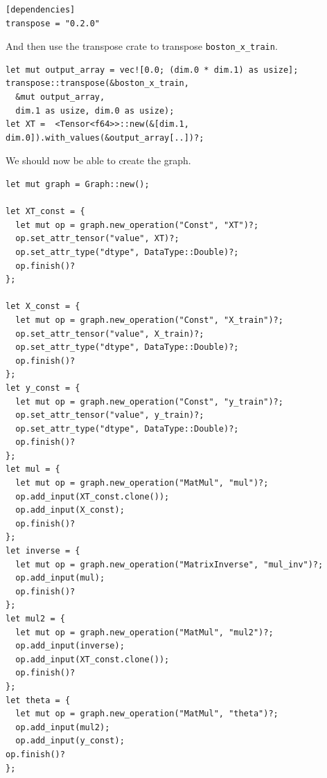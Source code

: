 \documentclass{book}
\begin{document}
\begin{lstlisting}[caption={chapter2\\/rust\_and\_tf\\/Cargo\\.toml}]
[dependencies]
transpose = "0.2.0"
\end{lstlisting}

And then use the transpose crate to transpose \lstinline{boston_x_train}.

\begin{lstlisting}[caption={chapter2\\/rustlymachine\_regression\\/src\\/lin\_reg\\.rs}]
let mut output_array = vec![0.0; (dim.0 * dim.1) as usize];
transpose::transpose(&boston_x_train,
  &mut output_array,
  dim.1 as usize, dim.0 as usize);
let XT =  <Tensor<f64>>::new(&[dim.1, dim.0]).with_values(&output_array[..])?;
\end{lstlisting}

We should now be able to create the graph.

\begin{lstlisting}[caption={chapter2\\/rustlymachine\_regression\\/src\\/lin\_reg\\.rs}]
let mut graph = Graph::new();

let XT_const = {
  let mut op = graph.new_operation("Const", "XT")?;
  op.set_attr_tensor("value", XT)?;
  op.set_attr_type("dtype", DataType::Double)?;
  op.finish()?
};

let X_const = {
  let mut op = graph.new_operation("Const", "X_train")?;
  op.set_attr_tensor("value", X_train)?;
  op.set_attr_type("dtype", DataType::Double)?;
  op.finish()?
};
let y_const = {
  let mut op = graph.new_operation("Const", "y_train")?;
  op.set_attr_tensor("value", y_train)?;
  op.set_attr_type("dtype", DataType::Double)?;
  op.finish()?
};
let mul = {
  let mut op = graph.new_operation("MatMul", "mul")?;
  op.add_input(XT_const.clone());
  op.add_input(X_const);
  op.finish()?
};
let inverse = {
  let mut op = graph.new_operation("MatrixInverse", "mul_inv")?;
  op.add_input(mul);
  op.finish()?
};
let mul2 = {
  let mut op = graph.new_operation("MatMul", "mul2")?;
  op.add_input(inverse);
  op.add_input(XT_const.clone());
  op.finish()?
};
let theta = {
  let mut op = graph.new_operation("MatMul", "theta")?;
  op.add_input(mul2);
  op.add_input(y_const);
op.finish()?
};
\end{lstlisting}
\end{document}
